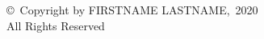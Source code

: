 
\thispagestyle{empty}
\addtocounter{page}{-1}
\vspace*{\fill}
\vfill
\begin{center}
\copyright\ Copyright by \MakeUppercase{Firstname Lastname},~2020\\
All Rights Reserved
\end{center}
\clearpage